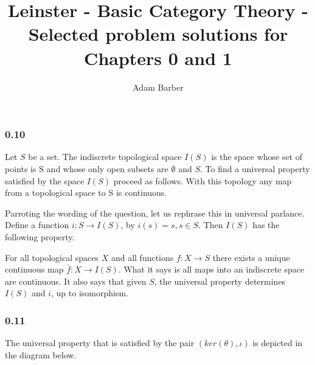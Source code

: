 \documentclass{article}
\begin{document}
\title{Leinster - Basic Category Theory - Selected problem solutions for Chapters 0 and 1}
\author{Adam Barber}

\maketitle
\subsubsection*{0.10}

Let $S$ be a set. The indiscrete topological space $I(S)$ is the space whose set of points is S and whose only open subsets are $\emptyset$ and $S$.
To find a universal property satisfied by the space $I(S)$ proceed as follows.
With this topology any map from a topological space to S is continuous.

Parroting the wording of the question, let us rephrase this in
universal parlance. Define a function $i\colon S \rightarrow I(S)$, by $i(s) = s, s \in S$.
Then $I(S)$ has the following property.


\begin{center}
\end{center}

For all topological spaces $X$ and all functions
$f\colon X \rightarrow S$ there exists a unique continuous map $\bar{f}\colon X \rightarrow I(S)$. What it says is all maps into an indiscrete space are continuous. It also says that given $S$, the universal property determines $I(S)$ and $i$, up to isomorphism.

\subsubsection*{0.11}

The universal property that is satisfied by the pair $(ker(\theta),\iota)$ is depicted in the diagram below.

\begin{center}
\end{center}
\end{document}
